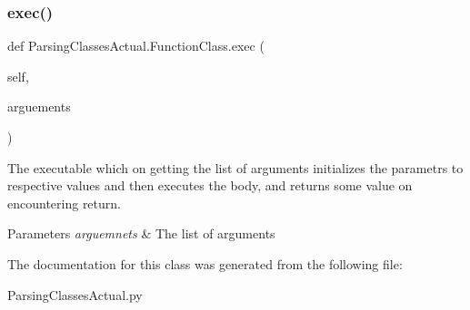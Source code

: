 \subsubsection{\texorpdfstring{exec()}{exec()}}
{\footnotesize\ttfamily def Parsing\+Classes\+Actual.\+Function\+Class.\+exec (\begin{DoxyParamCaption}\item[{}]{self,  }\item[{}]{arguements }\end{DoxyParamCaption})}



The executable which on getting the list of arguments initializes the parametrs to respective values and then executes the body, and returns some value on encountering return. 


\begin{DoxyParams}{Parameters}
{\em arguemnets} & The list of arguments \\
\hline
\end{DoxyParams}


The documentation for this class was generated from the following file\+:\begin{DoxyCompactItemize}
\item 
Parsing\+Classes\+Actual.\+py\end{DoxyCompactItemize}
